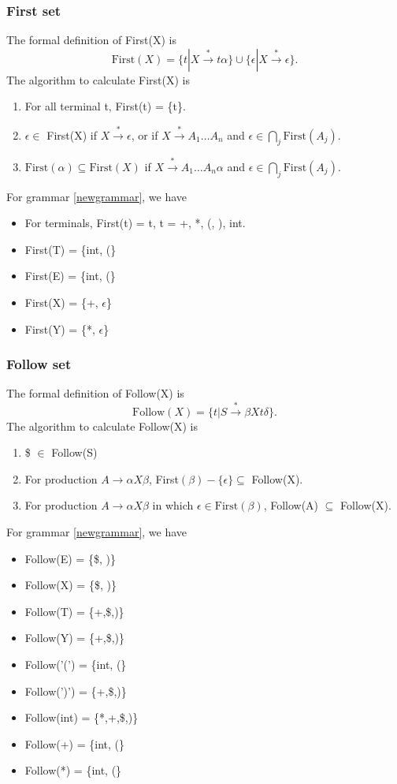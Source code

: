 \subsubsection{First set}
The formal definition of First(X) is 
\begin{equation*}
\text{First}(X) = \{t|X\xrightarrow{*}t\alpha\}\cup\{\epsilon|X\xrightarrow{*}\epsilon\}.
\end{equation*}
The algorithm to calculate First(X) is
\begin{enumerate}
\item For all terminal t, First(t) = \{t\}.
\item $\epsilon\in$ First(X) if $X\xrightarrow{*}\epsilon$, or if $X\xrightarrow{*}A_1\dots A_n$ and $\epsilon\in\bigcap\limits_j\text{First}(A_j)$.
\item $\text{First}(\alpha)\subseteq\text{First}(X)$ if $X\xrightarrow{*}A_1\dots A_n\alpha$ and $\epsilon\in\bigcap\limits_j\text{First}(A_j)$.
\end{enumerate}
For grammar \eqref{newgrammar}, we have 
\begin{itemize}
\item For terminals, First(t) = {t}, t = +, *, (, ), int.
\item First(T) = \{int, (\}
\item First(E) = \{int, (\}
\item First(X) = \{+, $\epsilon$\}
\item First(Y) = \{*, $\epsilon$\}
\end{itemize}
\subsubsection{Follow set}
The formal definition of Follow(X) is 
\begin{equation*}
\text{Follow}(X) = \{t|S\xrightarrow{*}\beta Xt\delta\}.
\end{equation*}
The algorithm to calculate Follow(X) is 
\begin{enumerate}
\item \$ $\in$ Follow(S)
\item For production $A\rightarrow\alpha X\beta$, First$(\beta) - \{\epsilon\}\subseteq$ Follow(X).
\item For production $A\rightarrow\alpha X\beta$ in which $\epsilon \in \text{First}(\beta)$, Follow(A) $\subseteq$ Follow(X).
\end{enumerate}
For grammar \eqref{newgrammar}, we have 
\begin{itemize}
\item Follow(E) = \{\$, )\}
\item Follow(X) = \{\$, )\}
\item Follow(T) = \{+,\$,)\}
\item Follow(Y) = \{+,\$,)\}
\item Follow('(') = \{int, (\}
\item Follow(')') = \{+,\$,)\}
\item Follow(int) = \{*,+,\$,)\}
\item Follow(+) = \{int, (\}
\item Follow(*) = \{int, (\}
\end{itemize}
